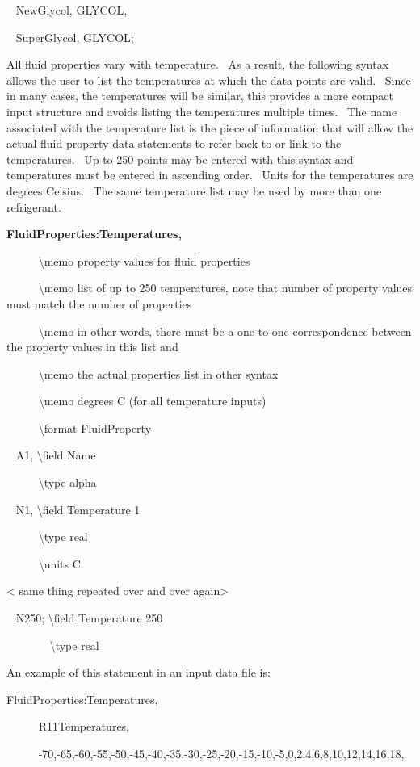~ NewGlycol, GLYCOL,

~ SuperGlycol, GLYCOL;

All fluid properties vary with temperature.~ As a result, the following syntax allows the user to list the temperatures at which the data points are valid.~ Since in many cases, the temperatures will be similar, this provides a more compact input structure and avoids listing the temperatures multiple times.~ The name associated with the temperature list is the piece of information that will allow the actual fluid property data statements to refer back to or link to the temperatures.~ Up to 250 points may be entered with this syntax and temperatures must be entered in ascending order.~ Units for the temperatures are degrees Celsius.~ The same temperature list may be used by more than one refrigerant.

\textbf{FluidProperties:Temperatures,}

~~~~~ \textbackslash{}memo property values for fluid properties

~~~~~ \textbackslash{}memo list of up to 250 temperatures, note that number of property values must match the number of properties

~~~~~ \textbackslash{}memo in other words, there must be a one-to-one correspondence between the property values in this list and

~~~~~ \textbackslash{}memo the actual properties list in other syntax

~~~~~ \textbackslash{}memo degrees C (for all temperature inputs)

~~~~~ \textbackslash{}format FluidProperty

~ A1, \textbackslash{}field Name

~~~~~ \textbackslash{}type alpha

~ N1, \textbackslash{}field Temperature 1

~~~~~ \textbackslash{}type real

~~~~~ \textbackslash{}units C

\textless{} same thing repeated over and over again\textgreater{}

~ N250; \textbackslash{}field Temperature 250

~~~~~~~ \textbackslash{}type real

An example of this statement in an input data file is:

FluidProperties:Temperatures,

~~~~~ R11Temperatures,

~~~~~ -70,-65,-60,-55,-50,-45,-40,-35,-30,-25,-20,-15,-10,-5,0,2,4,6,8,10,12,14,16,18,

